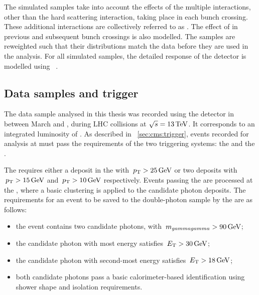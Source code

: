 The simulated samples take into account the effects of the multiple interactions, other than the hard scattering interaction, taking place in each bunch crossing. These additional interactions are collectively referred to as \PU. The effect of \PU in previous and subsequent bunch crossings is also modelled. The samples are reweighted such that their \PU distributions match the data before they are used in the analysis.
For all simulated samples, the detailed response of the \CMS detector is modelled using \Geant~\cite{Geant}.


\subsection{Data samples and trigger} %
\label{sec:reco:data}

The data sample analysed in this thesis was recorded using the \CMS detector in between March and , during \pp LHC collisions at $\sqrt{s}=13\,\text{Te\hspace{-.08em}V}$. It corresponds to an integrated luminosity of \thisanalysislumi\ifb. As described in \Sec~\ref{sec:cms:trigger}, events recorded for analysis at \CMS must pass the requirements of the two \CMS triggering systems: the \LI and the \HLT. 

The \LI requires either a deposit in the \ECAL with $\,p_\text{T}>25\,\text{Ge\hspace{-.08em}V}$ or two deposits with $\,p_\text{T}>15\,\text{Ge\hspace{-.08em}V}$ and $\,p_\text{T}>10\,\text{Ge\hspace{-.08em}V}$ respectively. Events passing the \LI are processed at the \HLT, where a basic clustering is applied to the candidate photon deposits. The requirements for an event to be saved to the double-photon sample by the \HLT are as follows:

\begin{itemize}
\item the event contains two candidate photons, with $\,m_{gammagamma} > 90\,\text{Ge\hspace{-.08em}V}$;
\item the candidate photon with most energy satisfies $\,E_\text{T} >30\,\text{Ge\hspace{-.08em}V}$; 
\item the candidate photon with second-most energy satisfies $\,E_\text{T} >18\,\text{Ge\hspace{-.08em}V}$;
\item both candidate photons pass a basic calorimeter-based identification using shower shape and isolation requirements.
\end{itemize}


